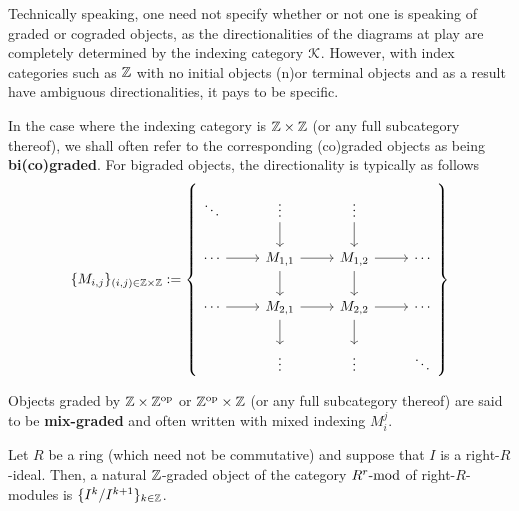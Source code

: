             \begin{convention}
                Technically speaking, one need not specify whether or not one is speaking of graded or cograded objects, as the directionalities of the diagrams at play are completely determined by the indexing category $\calK$. However, with index categories such as $\Z$ with no initial objects (n)or terminal objects and as a result have ambiguous directionalities, it pays to be specific. 
                
                In the case where the indexing category is $\Z \x \Z$ (or any full subcategory thereof), we shall often refer to the corresponding (co)graded objects as being \textbf{bi(co)graded}. For bigraded objects, the directionality is typically as follows
                    $$
                        \{M_{i, j}\}_{(i, j) \in \Z \x \Z} := 
                        \left\{
                            \begin{tikzcd}
                        	\ddots & \vdots & \vdots \\
                        	\cdots & {M_{1, 1}} & {M_{1, 2}} & \cdots \\
                        	\cdots & {M_{2, 1}} & {M_{2,2}} & \cdots \\
                        	& \vdots & \vdots & \ddots
                        	\arrow[from=2-2, to=3-2]
                        	\arrow[from=3-2, to=4-2]
                        	\arrow[from=3-3, to=4-3]
                        	\arrow[from=2-3, to=3-3]
                        	\arrow[from=2-2, to=2-3]
                        	\arrow[from=3-2, to=3-3]
                        	\arrow[from=3-3, to=3-4]
                        	\arrow[from=2-3, to=2-4]
                        	\arrow[from=2-1, to=2-2]
                        	\arrow[from=1-2, to=2-2]
                        	\arrow[from=1-3, to=2-3]
                        	\arrow[from=3-1, to=3-2]
                        \end{tikzcd}
                        \right\}
                    $$
                
                Objects graded by $\Z \x \Z^{\op}$ or $\Z^{\op} \x \Z$ (or any full subcategory thereof) are said to be \textbf{mix-graded} and often written with mixed indexing $M_i^j$.
            \end{convention}
            \begin{example}
                Let $R$ be a ring (which need not be commutative) and suppose that $I$ is a right-$R$-ideal. Then, a natural $\Z$-graded object of the category $R^r\mod$ of right-$R$-modules is $\{I^k/I^{k + 1}\}_{k \in \Z}$.
            \end{example}
